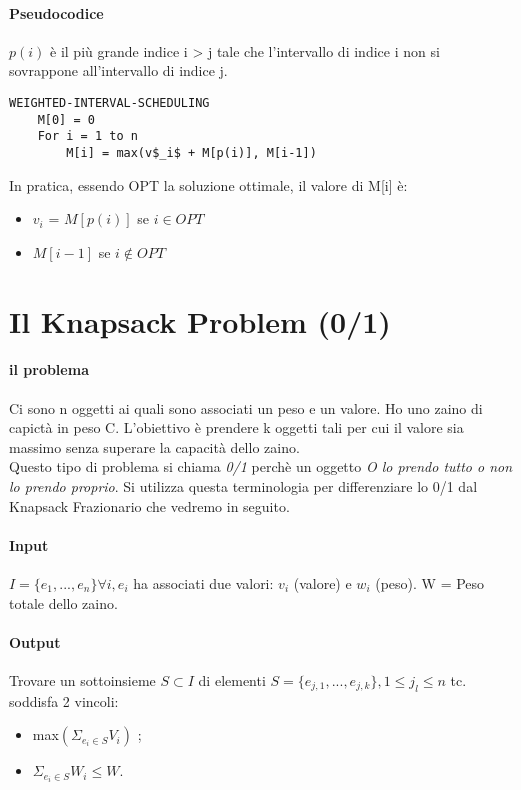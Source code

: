 \documentclass[12pt, a4paper, openany]{book}
\begin{document}
\paragraph{Pseudocodice}
$p(i)$ è il più grande indice i > j tale che l'intervallo di indice i non si sovrappone all'intervallo di indice j.
\begin{lstlisting}[mathescape=true]
WEIGHTED-INTERVAL-SCHEDULING 
	M[0] = 0
	For i = 1 to n
		M[i] = max(v$_i$ + M[p(i)], M[i-1])
\end{lstlisting}
In pratica, essendo OPT la soluzione ottimale, il valore di M[i] è:
\begin{itemize}
	\item $v_i$ = $M[p(i)]$ se $i \in OPT$
	\item $M[i-1]$ se $i \notin OPT$
\end{itemize}

\section{Il Knapsack Problem (0/1)}
\paragraph{il problema} Ci sono n oggetti ai quali sono associati un peso e un valore. Ho uno zaino di capictà in peso C. L'obiettivo è prendere k oggetti tali per cui il valore sia massimo senza superare la capacità dello zaino.\\
Questo tipo di problema si chiama \emph{0/1} perchè un oggetto \emph{O lo prendo tutto o non lo prendo proprio}. Si utilizza questa terminologia per differenziare lo 0/1 dal Knapsack Frazionario che vedremo in seguito.
\paragraph{Input} $I = \{e_1,...,e_n\} \forall  i, e_i$ ha associati due valori: $v_i$ (valore) e $w_i$ (peso). W = Peso totale dello zaino.
\paragraph{Output} Trovare un sottoinsieme $ S \subset I $ di elementi $S = \{e_{j,1}, ..., e_{j,k}\} , 1 \leq j_l \leq n$ tc. soddisfa 2 vincoli:
\begin{itemize}
	\item max$(\Sigma_{e_i \in S}V_i)$ ;
	\item $\Sigma_{e_i \in S} W_i \leq W$.
\end{itemize} 
\end{document}
